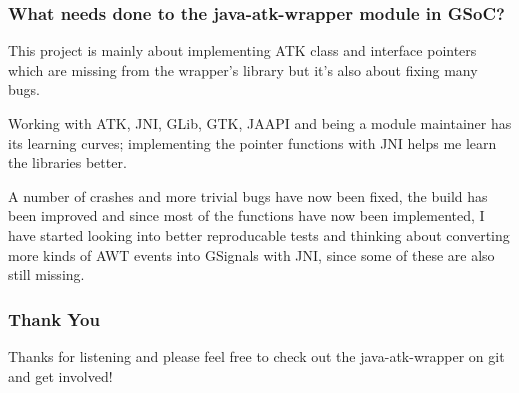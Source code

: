 \documentclass[aspectratio=169]{beamer}
\begin{document}
\begin{frame}
\frametitle{What needs done to the java-atk-wrapper module in GSoC?}
      \begin{center}
      This project is mainly about implementing ATK class and interface pointers which are missing from the wrapper's library but it's also about fixing many bugs.
      \end{center}
            \begin{center}
      Working with ATK, JNI, GLib, GTK, JAAPI and being a module maintainer has its learning curves; implementing the pointer functions with JNI helps me learn the libraries better.
      \end{center}
                  \begin{center}
      A number of crashes and more trivial bugs have now been fixed, the build has been improved and since most of the functions have now been implemented, I have started looking into better reproducable tests and thinking about converting more kinds of AWT events into GSignals with JNI, since some of these are also still missing.
                  \end{center}
\end{frame}

\begin{frame}
\frametitle{Thank You}
\begin{center}
  Thanks for listening and please feel free to check out the java-atk-wrapper on git and get involved!
\end{center}
\end{frame}
\end{document}

